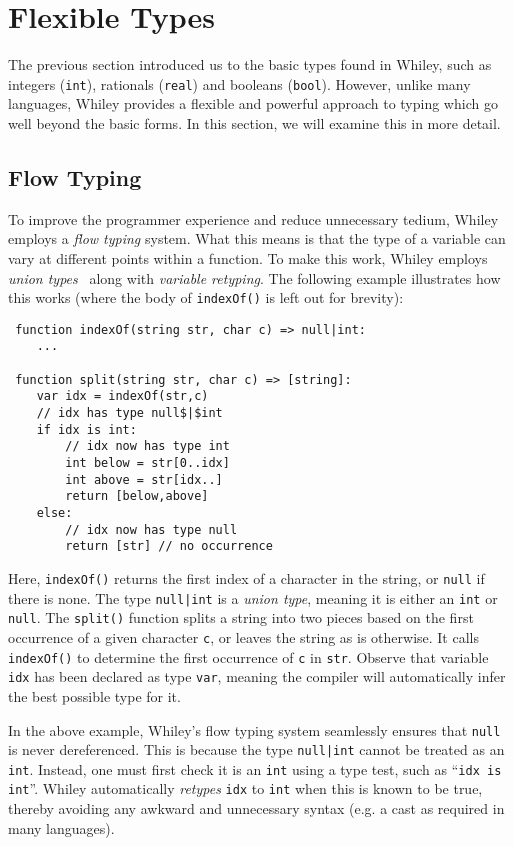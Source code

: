\newpage
\section{Flexible Types}
The previous section introduced us to the basic types found in Whiley,
such as integers (\lstinline{int}), rationals (\lstinline{real}) and
booleans (\lstinline{bool}).  However, unlike many languages, Whiley
provides a flexible and powerful approach to typing which go well
beyond the basic forms.  In this section, we will examine this in more
detail.

\subsection{Flow Typing}
To improve the programmer experience and reduce unnecessary tedium,
Whiley employs a {\em flow typing} system.  What this means is that
the type of a variable can vary at different points within a function.
To make this work, Whiley employs {\em union types}~\cite{BC91,IN07} along with {\em variable retyping}.  The
following example illustrates how this works (where the body of
\lstinline{indexOf()} is left out for brevity):

\begin{lstlisting}
 function indexOf(string str, char c) => null|int:
    ...

 function split(string str, char c) => [string]:
    var idx = indexOf(str,c)
    // idx has type null$|$int
    if idx is int:
        // idx now has type int
        int below = str[0..idx]
        int above = str[idx..]
        return [below,above]
    else:
        // idx now has type null
        return [str] // no occurrence
\end{lstlisting}
Here, \lstinline{indexOf()} returns the first index of a character in
the string, or \lstinline{null} if there is none.  The type
\lstinline{null|int} is a {\em union type}, meaning it is either an
\lstinline{int} or \lstinline{null}.  The \lstinline{split()} function
splits a string into two pieces based on the first occurrence of a
given character \lstinline{c}, or leaves the string as is otherwise.
It calls \lstinline{indexOf()} to determine the first occurrence of
\lstinline{c} in \lstinline{str}.  Observe that variable
\lstinline{idx} has been declared as type \lstinline{var}, meaning the
compiler will automatically infer the best possible type for it.

In the above example, Whiley's flow typing system seamlessly ensures
that \lstinline{null} is never dereferenced.  This is because the type
\lstinline{null|int} cannot be treated as an \lstinline{int}.
Instead, one must first check it is an \lstinline{int} using a type
test, such as ``\lstinline{idx is int}''.  Whiley automatically
{\em retypes} \lstinline{idx} to \lstinline{int} when this is known to be
true, thereby avoiding any awkward and unnecessary syntax (e.g. a cast
as required in many languages).

